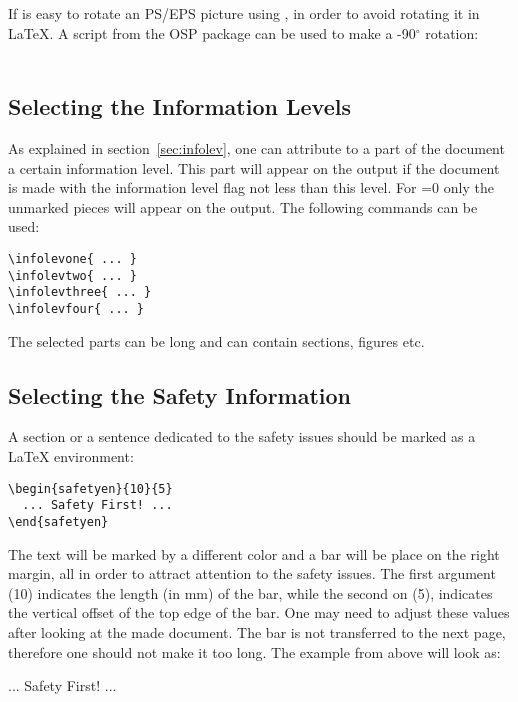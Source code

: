 \documentclass[12pt,letterpaper]{article}
\newcommand{\myil}[0]{{\color{red}{\em infolevel}}}
\begin{document}
  If is easy to rotate an PS/EPS picture using , in
  order to avoid rotating it in \LaTeX{}. A script from the OSP package
  can be used to make a -90$^\circ$ rotation: \\
\\

\subsection{Selecting the Information Levels}
\label{sec:selinfolev}

  As explained in section~\ref{sec:infolev}, one can attribute to a
  part of the document a certain information level.
  This part will appear on the output if the document is made
  with the information level flag \myil{} not less than this level.
  For \myil{}=0 only the unmarked pieces will appear on the output.
  The following commands can be used:
  {\color{blue}
   \begin{verbatim}
\infolevone{ ... }
\infolevtwo{ ... }
\infolevthree{ ... }
\infolevfour{ ... }
  \end{verbatim}%
  }\noindent
  The selected parts can be long and can contain sections, figures etc.


\subsection{Selecting the Safety Information}
\label{sec:safety}

  A section or a sentence dedicated to the safety issues
  should be marked as a \LaTeX{} environment:
  {\color{blue}
   \begin{verbatim}
\begin{safetyen}{10}{5}
  ... Safety First! ...
\end{safetyen}
  \end{verbatim}%
  }\noindent
  The text will be marked by a different color and a bar
  will be place on the right margin, all in order to attract 
  attention to the safety issues.
  The first argument (10)
  indicates the length (in mm) of the bar, while the second on (5),
  indicates the vertical offset of the top edge of the bar.
  One may need to adjust these values after looking
  at the made document. The bar is not transferred to the next page,
  therefore one should not make it too long. The example from
  above will look as: \\
\begin{safetyen}{10}{5}
  ... Safety First! ...
\end{safetyen}
\end{document}
